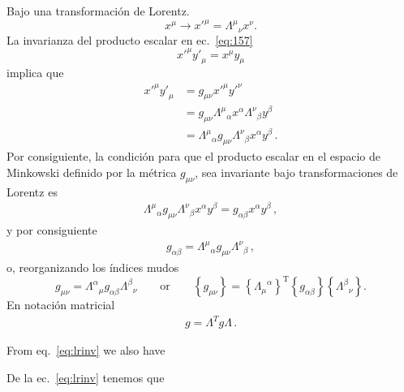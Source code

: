 \begin{frame}
Bajo una transformaci\'on de Lorentz.
\begin{equation}
  x^\mu\to {x'}^\mu={\Lambda^\mu}_{\nu}x^\nu.
\end{equation}
La invarianza del producto escalar en ec.~\eqref{eq:157}
\begin{equation}
  {x'}^\mu{y'}_\mu=x^\mu y_\mu
\end{equation}
implica que
\begin{align}
\label{eq:Lambdasteps}
  {x'}^\mu{y'}_\mu&=g_{\mu\nu}{x'}^\mu{y'}^{\nu}\nonumber\\
  &=g_{\mu\nu}{\Lambda^{\mu}}_{\alpha}x^{\alpha}{\Lambda^{\nu}}_{\beta}y^{\beta}\nonumber\\
 &={\Lambda^{\mu}}_{\alpha}g_{\mu\nu}{\Lambda^{\nu}}_{\beta}x^{\alpha}y^{\beta}\,.
\end{align}
Por consiguiente, la condición para que el producto escalar  en el espacio de Minkowski definido por la métrica $g_{\mu\nu}$, sea invariante bajo transformaciones de Lorentz es
\begin{align}
  {\Lambda^{\mu}}_{\alpha}g_{\mu\nu}{\Lambda^{\nu}}_{\beta}x^{\alpha}y^{\beta}=
  g_{\alpha\beta}x^{\alpha}y^{\beta}\,,
\end{align}
y por consiguiente
\begin{align}
  g_{\alpha\beta}={\Lambda^{\mu}}_{\alpha}g_{\mu\nu}{\Lambda^{\nu}}_{\beta}\,,
\end{align}
o, reorganizando los índices mudos
\begin{equation}
  \label{eq:lrinv}
  g_{\mu\nu}={\Lambda^\alpha}_{\mu}g_{\alpha\beta}{\Lambda^\beta}_{\nu}\qquad\text{or}\qquad 
\left\{g_{\mu\nu}\right\}=\left\{{\Lambda_{\mu}}^{\alpha}\right\}^{\text{T}}\left\{g_{\alpha\beta}\right\}\left\{{\Lambda^\beta}_{\nu}\right\}.
\end{equation}
En notaci\'on matricial
\begin{align}
 g=\Lambda^T g \Lambda\,. 
\end{align}

\begin{english}
From eq.~\eqref{eq:lrinv} we also have  
\end{english}
\begin{spanish}
De la ec.~\eqref{eq:lrinv} tenemos que
\end{spanish}


\end{frame}
